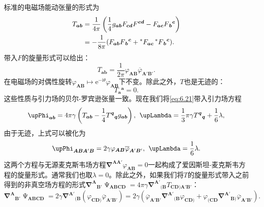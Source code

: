 标准的电磁场能动张量的形式为
\begin{equation}
	\begin{aligned}
		T_{\boldsymbol{ab}} & =\frac{1}{4\pi }\left(\frac{1}{4} g_{\boldsymbol{ab}} F_{\boldsymbol{cd}} F^{\boldsymbol{cd}} -F_{\boldsymbol{ac}} F{_{\boldsymbol{b}}}^{\boldsymbol{c}}\right)\\
		& =-\frac{1}{8\pi } (F_{\boldsymbol{ab}} F{_{\boldsymbol{b}}}^{\boldsymbol{c}} +\prescript{*}{}{} F_{\boldsymbol{ac}}\prescript{*}{}{} F{_{\boldsymbol{b}}}^{\boldsymbol{c}} ).
	\end{aligned}
	\label{eq:6.20}
\end{equation}
带入$F$的旋量形式可以给出：
\begin{equation}
	T_{\boldsymbol{ab}} =\frac{1}{2\pi } \varphi _{\boldsymbol{AB}}\overline{\varphi }_{\boldsymbol{A} '\boldsymbol{B} '} .
	\label{eq:6.21}
\end{equation}
在电磁场的对偶性旋转$\varphi _{\boldsymbol{AB}} \mapsto \mathrm{e}^{-\mathrm{i} \theta } \varphi _{\boldsymbol{AB}}$下不变。除此之外，$T$也是无迹的：
\begin{equation*}
	T{_{\boldsymbol{a}}}^{\boldsymbol{a}} =0.
\end{equation*}
这些性质与引力场的贝尔-罗宾逊张量一致。现在我们将\ref{eq:6.21}带入引力场方程
\begin{equation*}
	\upPhi _{\boldsymbol{ab}} =4\pi \gamma \left( T_{\boldsymbol{ab}} -\frac{1}{4} T^{\boldsymbol{q}}{}_{\boldsymbol{q}} g_{\boldsymbol{ab}}\right) ,\kern+0.4em \upLambda =\frac{1}{3} \pi \gamma T^{\boldsymbol{q}}{}_{\boldsymbol{q}} +\frac{1}{6} \lambda ,
\end{equation*}
由于无迹，上式可以被化为
\begin{equation*}
	\upPhi _{\boldsymbol{ABA} '\boldsymbol{B}} =2\gamma \varphi _{\boldsymbol{AB}}\overline{\varphi }_{\boldsymbol{A} '\boldsymbol{B} '} ,\kern+0.4em \upLambda =\frac{1}{6} \lambda .
\end{equation*}
这两个方程与无源麦克斯韦场方程$\boldsymbol{\nabla }^{\boldsymbol{AA} '} \varphi _{\boldsymbol{AB}} =0$一起构成了爱因斯坦-麦克斯韦方程的旋量形式。通常我们也取$\lambda =0$。除此之外，如果我们将$T$的旋量形式带入之前得到的非真空场方程的形式$\boldsymbol{\nabla }^{\boldsymbol{A}}{}_{\boldsymbol{B} '} \upPsi _{\boldsymbol{ABCD}} =4\pi \gamma \boldsymbol{\nabla }^{\boldsymbol{A} '}{}_{(\boldsymbol{B}} T_{\boldsymbol{CD})\boldsymbol{A} '\boldsymbol{B} '}$：
\begin{equation*}
	\boldsymbol{\nabla }^{\boldsymbol{A}}{}_{\boldsymbol{B} '} \upPsi _{\boldsymbol{ABCD}} =2\gamma \boldsymbol{\nabla }^{\boldsymbol{A} '}{}_{(\boldsymbol{B}} (\varphi _{\boldsymbol{CD})}\overline{\varphi }_{\boldsymbol{A} '\boldsymbol{B} '} )=2\gamma (\overline{\varphi }_{\boldsymbol{A} '\boldsymbol{B} '}\boldsymbol{\nabla }^{\boldsymbol{A} '}{}_{(\boldsymbol{B}} \varphi _{\boldsymbol{CD})} +\varphi _{(\boldsymbol{CD}}\boldsymbol{\nabla }^{\boldsymbol{A} '}{}_{\boldsymbol{B})}\overline{\varphi }_{\boldsymbol{A} '\boldsymbol{B} '} ).
\end{equation*}
